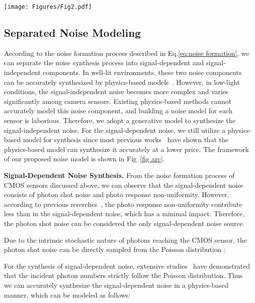 \documentclass[10pt,twocolumn,letterpaper]{article}
\begin{document}
\begin{figure*}[htbp]
\centering
\texttt{[image: Figures/Fig2.pdf]}
\caption{Overview of the framework. The proposed noise model is divided into three components: (a) signal-dependent noise synthesis, (b) signal-independent noise synthesis, and (c) domain alignment. Please refer to Sec.~\ref{method} for more detailed descriptions.}
\label{fig arc}
\vspace{-2ex}
\end{figure*}

\subsection{Separated Noise Modeling}
According to the noise formation process described in Eq.\eqref{eq:noise formation}, we can separate the noise synthesis process into signal-dependent and signal-independent components. In well-lit environments, these two noise components can be accurately synthesized by physics-based models~\cite{zhang2021rethinking}. However, in low-light conditions, the signal-independent noise becomes more complex and varies significantly among camera sensors. Existing physics-based methods cannot accurately model this noise component, and building a noise model for each sensor is laborious. Therefore, we adopt a generative model to synthesize the signal-independent noise. For the signal-dependent noise, we still utilize a physics-based model for synthesis since most previous works~\cite{foi2009clipped,wei2020physics,zhang2021rethinking} have shown that the physics-based model can synthesize it accurately at a lower price. The framework of our proposed noise model is shown in Fig~\ref{fig arc}.

\textbf{Signal-Dependent Noise Synthesis.} From the noise formation process of CMOS sensors discussed above, we can observe that the signal-dependent noise consists of photon shot noise and photo response non-uniformity. However, according to previous reserches~\cite{gow2007comprehensive,janesick1987scientific}, the photo response non-uniformity contribute less than  in the signal-dependent noise, which has a minimal impact. Therefore, the photon shot noise can be considered the only signal-dependent noise source.

Due to the intrinsic stochastic nature of photons reaching the CMOS sensor, the photon shot noise can be directly sampled from the Poisson distribution :


For the synthesis of signal-dependent noise, extensive studies~\cite{wei2020physics,zhang2021rethinking} have demonstrated that the incident photon numbers strictly follow the Poisson distribution. Thus we can accurately synthesize the signal-dependent noise in a physics-based manner, which can be modeled as follows:
\end{document}
